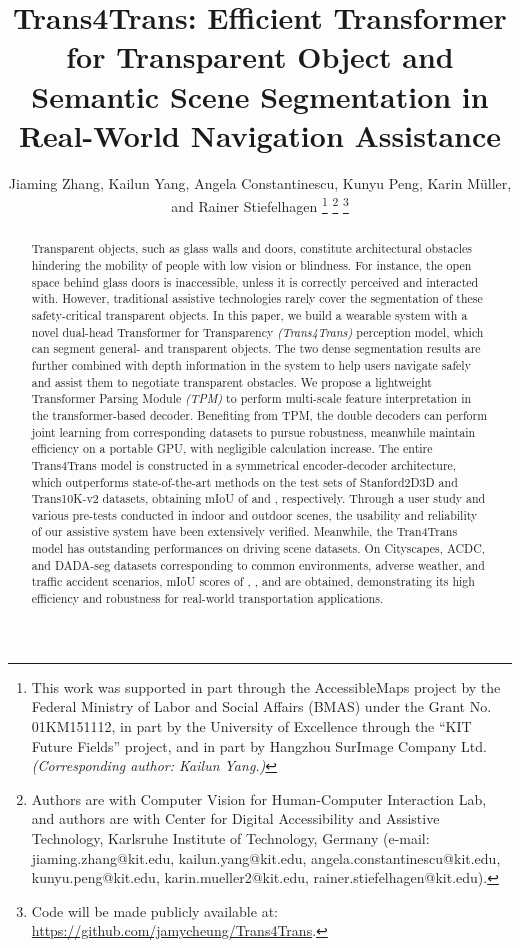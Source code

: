 \documentclass[journal]{IEEEtran}
\begin{document}
\title{Trans4Trans: Efficient Transformer for Transparent Object and Semantic Scene Segmentation in Real-World Navigation Assistance}
\author{Jiaming Zhang, Kailun Yang, Angela Constantinescu, Kunyu Peng, Karin Müller, and Rainer Stiefelhagen
\thanks{This work was supported in part through the AccessibleMaps project by the Federal Ministry of Labor and Social Affairs (BMAS) under the Grant No. 01KM151112, in part by the University of Excellence through the ``KIT Future Fields'' project, and in part by Hangzhou SurImage Company Ltd.
\emph{(Corresponding author: Kailun Yang.)}}
\thanks{Authors are with Computer Vision for Human-Computer Interaction Lab, and authors are with Center for Digital Accessibility and Assistive Technology, Karlsruhe Institute of Technology, Germany (e-mail: jiaming.zhang@kit.edu, kailun.yang@kit.edu, angela.constantinescu@kit.edu, kunyu.peng@kit.edu, karin.mueller2@kit.edu, rainer.stiefelhagen@kit.edu).}
\thanks{Code will be made publicly available at: \url{https://github.com/jamycheung/Trans4Trans}.}
}

\maketitle
{}
\begin{abstract}
Transparent objects, such as glass walls and doors, constitute architectural obstacles hindering the mobility of people with low vision or blindness. For instance, the open space behind glass doors is inaccessible,
unless it is correctly perceived and interacted with. However, traditional assistive technologies rarely cover the segmentation of these safety-critical transparent objects. In this paper, we build a wearable system with a novel dual-head Transformer for Transparency \emph{(Trans4Trans)} perception model, which can segment general- and transparent objects. The two dense segmentation results are further combined with depth information in the system to help users navigate safely and assist them to negotiate transparent obstacles. We propose a lightweight Transformer Parsing Module \emph{(TPM)} to perform multi-scale feature interpretation in the transformer-based decoder. Benefiting from TPM, the double decoders can perform joint learning from corresponding datasets to pursue robustness, meanwhile maintain efficiency on a portable GPU, with negligible calculation increase. The entire Trans4Trans model is constructed in a symmetrical encoder-decoder architecture, which outperforms state-of-the-art methods on the test sets of Stanford2D3D and Trans10K-v2 datasets, obtaining mIoU of  and , respectively. Through a user study and various pre-tests conducted in indoor and outdoor scenes, the usability and reliability of our assistive system have been extensively verified. Meanwhile, the Tran4Trans model has outstanding performances on driving scene datasets. On Cityscapes, ACDC, and DADA-seg datasets corresponding to common environments, adverse weather, and traffic accident scenarios, mIoU scores of , , and  are obtained, demonstrating its high efficiency and robustness for real-world transportation applications.

\end{abstract}
\end{document}
